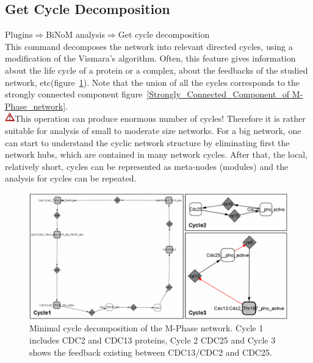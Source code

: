 \subsection{Get Cycle Decomposition}
Plugins$\Rightarrow$BiNoM analysis$\Rightarrow$Get cycle decomposition\\
This command decomposes the network into relevant directed cycles\cite{gleiss2001relevant}, using a modification of the Vismara’s algorithm\cite{vismara1997union}. Often, this feature gives information about the life cycle of a protein or a complex, about the feedbacks of the studied network, etc(figure~\ref{Minimal_cycle_decomposition_of_the M-Phase}). Note that the union of all the cycles corresponds to the strongly connected component figure~\ref{Strongly_Connected_Component_of M-Phase_network}.\\
\includegraphics[width=12pt,height=12pt]{graphics/warning}This operation can produce enormous number of cycles! Therefore it is rather suitable for analysis of small to moderate size networks. For a big network, one can start to understand the cyclic network structure by eliminating first the network hubs, which are contained in many network cycles. After that, the local, relatively short, cycles can be represented as meta-nodes (modules) and the analysis for cycles can be repeated.\\
\begin{figure}
\centering
\includegraphics[width=14 cm]{graphics/Minimal_cycle_decomposition_of_the_M-Phase}
\caption{Minimal cycle decomposition of the M-Phase network.  Cycle 1 includes CDC2 and CDC13 proteins, Cycle 2 CDC25 and Cycle 3 shows the feedback existing between CDC13/CDC2 and CDC25.}
\label{Minimal_cycle_decomposition_of_the M-Phase}
\end{figure}
